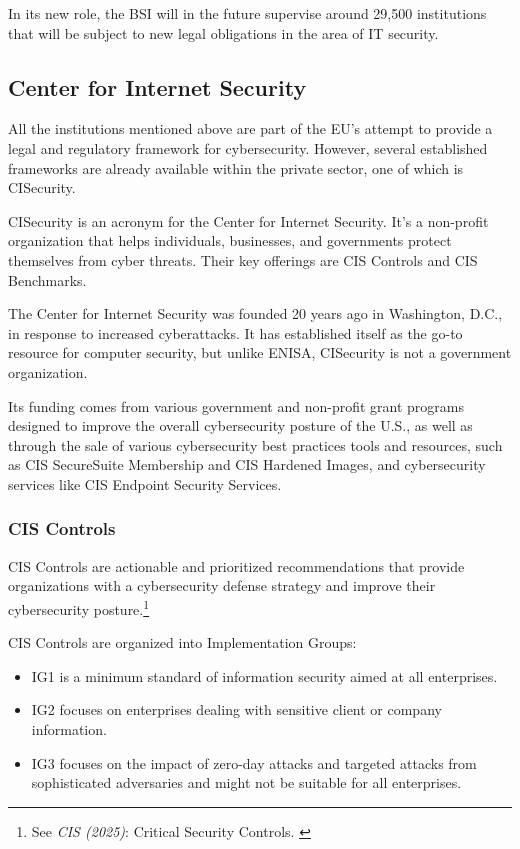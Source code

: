 In its new role, the BSI will in the future supervise around 29,500 institutions that will be subject to new legal obligations in the area of IT security.

\subsection{Center for Internet Security}

All the institutions mentioned above are part of the EU's attempt to provide a legal and regulatory framework for cybersecurity. However, several established frameworks are already available within the private sector, one of which is CISecurity.

CISecurity is an acronym for the Center for Internet Security. It's a non-profit organization that helps individuals, businesses, and governments protect themselves from cyber threats. Their key offerings are CIS Controls and CIS Benchmarks.

The Center for Internet Security was founded 20 years ago in Washington, D.C., in response to increased cyberattacks. It has established itself as the go-to resource for computer security, but unlike ENISA, CISecurity is not a government organization.

Its funding comes from various government and non-profit grant programs designed to improve the overall cybersecurity posture of the U.S., as well as through the sale of various cybersecurity best practices tools and resources, such as CIS SecureSuite Membership and CIS Hardened Images, and cybersecurity services like CIS Endpoint Security Services.

\subsubsection{CIS Controls}

CIS Controls are actionable and prioritized recommendations that provide organizations with a cybersecurity defense strategy and improve their cybersecurity posture.\footnote{See \textit{CIS (2025)}: Critical Security Controls. \cite{cisControls}}

CIS Controls are organized into Implementation Groups:

\begin{itemize}
    \item IG1 is a minimum standard of information security aimed at all enterprises.
    \item IG2 focuses on enterprises dealing with sensitive client or company information.
    \item IG3 focuses on the impact of zero-day attacks and targeted attacks from sophisticated adversaries and might not be suitable for all enterprises.
\end{itemize}

